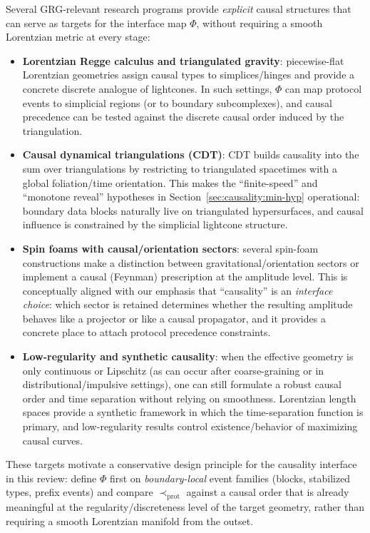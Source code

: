 Several GRG-relevant research programs provide \emph{explicit} causal structures that can serve as targets for the interface map \(\Phi\), without requiring a smooth Lorentzian metric at every stage:
\begin{itemize}[leftmargin=*,itemsep=2pt]
  \item \textbf{Lorentzian Regge calculus and triangulated gravity}: piecewise-flat Lorentzian geometries assign causal types to simplices/hinges and provide a concrete discrete analogue of lightcones. In such settings, \(\Phi\) can map protocol events to simplicial regions (or to boundary subcomplexes), and causal precedence can be tested against the discrete causal order induced by the triangulation.\cite{Regge1961}
  \item \textbf{Causal dynamical triangulations (CDT)}: CDT builds causality into the sum over triangulations by restricting to triangulated spacetimes with a global foliation/time orientation. This makes the ``finite-speed'' and ``monotone reveal'' hypotheses in Section~\ref{sec:causality:min-hyp} operational: boundary data blocks naturally live on triangulated hypersurfaces, and causal influence is constrained by the simplicial lightcone structure.\cite{AmbjornGoerlichJurkiewiczLoll2012NonperturbativeQG,Loll2019CDTReview}
  \item \textbf{Spin foams with causal/orientation sectors}: several spin-foam constructions make a distinction between gravitational/orientation sectors or implement a causal (Feynman) prescription at the amplitude level. This is conceptually aligned with our emphasis that ``causality'' is an \emph{interface choice}: which sector is retained determines whether the resulting amplitude behaves like a projector or like a causal propagator, and it provides a concrete place to attach protocol precedence constraints.\cite{LivineOriti2003CausalSpinFoam,Engle2013ProperVertex}
  \item \textbf{Low-regularity and synthetic causality}: when the effective geometry is only continuous or Lipschitz (as can occur after coarse-graining or in distributional/impulsive settings), one can still formulate a robust causal order and time separation without relying on smoothness. Lorentzian length spaces provide a synthetic framework in which the time-separation function is primary, and low-regularity results control existence/behavior of maximizing causal curves.\cite{KunzingerSamann2018LorentzianLengthSpaces,Ling2020AspectsC0,LangeLytchakSamann2020LorentzLipschitz}
\end{itemize}

These targets motivate a conservative design principle for the causality interface in this review: define \(\Phi\) first on \emph{boundary-local} event families (blocks, stabilized types, prefix events) and compare \(\prec_{\mathrm{prot}}\) against a causal order that is already meaningful at the regularity/discreteness level of the target geometry, rather than requiring a smooth Lorentzian manifold from the outset.